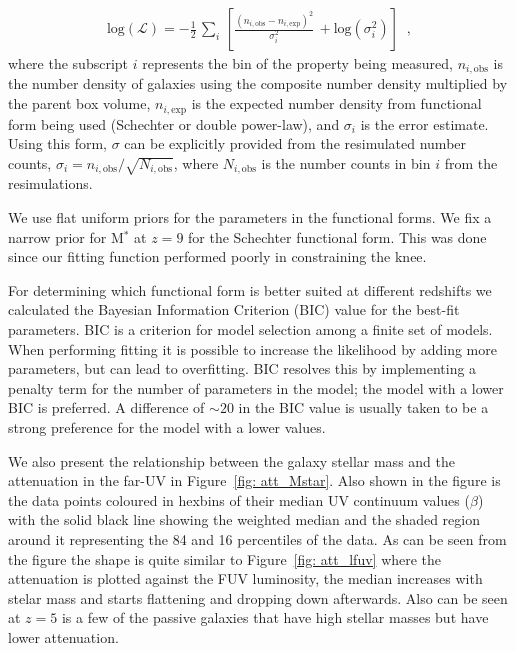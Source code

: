 \begin{align}
\mathrm{log}(\mathcal{L}) = - \frac{1}{2} \,  \sum_{i} \,\left[ \frac{ (n_{i,\mathrm{obs}} - n_{i,\mathrm{exp}})^2 }{\sigma_{i}^{2}} \, + \mathrm{log}(\sigma_{i}^{2}) \right] \;\;,
\end{align}
where the subscript $i$ represents the bin of the property being measured, $n_{i,\mathrm{obs}}$ is the number density of galaxies using the composite number density multiplied by the parent box volume, $n_{i,\mathrm{exp}}$ is the expected number density from functional form being used (Schechter or double power-law), and $\sigma_i$ is the error estimate. Using this form, $\sigma$ can be explicitly provided from the resimulated number counts, $\sigma_{i} = n_{i,\mathrm{obs}} / \sqrt{N_{i,\mathrm{obs}}}$, where $N_{i,\mathrm{obs}}$ is the number counts in bin $i$ from the resimulations.

We use flat uniform priors for the parameters in the functional forms. We fix a narrow prior for M$^*$ at $z=9$ for the Schechter functional form. This was done since our fitting function performed poorly in constraining the knee. 

For determining which functional form is better suited at different redshifts we calculated the Bayesian Information Criterion (BIC) value for the best-fit parameters. BIC is a criterion for model selection among a finite set of models. When performing fitting it is possible to increase the likelihood by adding more parameters, but can lead to overfitting. BIC resolves this by implementing a penalty term for the number of parameters in the model; the model with a lower BIC is preferred. A difference of $\sim 20$ in the BIC value is usually taken to be a strong preference for the model with a lower values. 

We also present the relationship between the galaxy stellar mass and the attenuation in the far-UV in Figure~\ref{fig: att_Mstar}. Also shown in the figure is the data points coloured in hexbins of their median UV continuum values ($\beta$) with the solid black line showing the weighted median and the shaded region around it representing the 84 and 16 percentiles of the data. As can be seen from the figure the shape is quite similar to Figure~\ref{fig: att_lfuv} where the attenuation is plotted against the FUV luminosity, the median increases with stelar mass and starts flattening and dropping down afterwards. Also can be seen at $z=5$ is a few of the passive galaxies that have high stellar masses but have lower attenuation.

